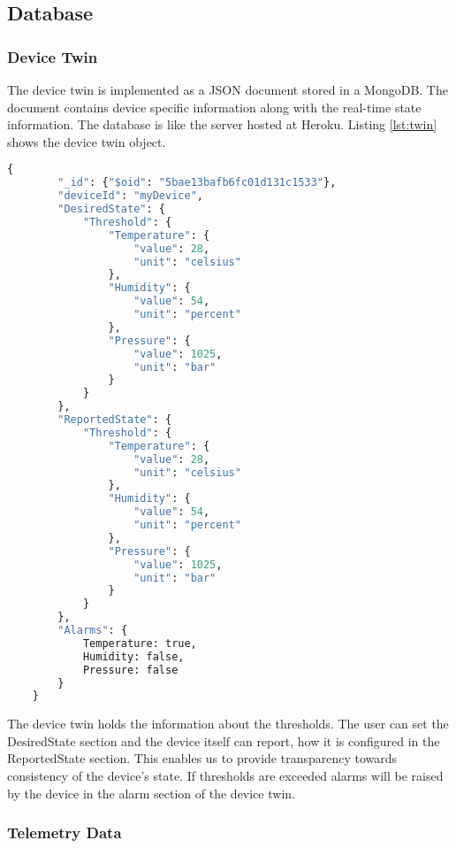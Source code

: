 \subsection{Database}
\subsubsection{Device Twin}
The device twin is implemented as a JSON document stored in a MongoDB. The document contains device specific information along with the real-time state information. The database is like the server hosted at Heroku. Listing \ref{lst:twin} shows the device twin object.
\begin{lstlisting}[language=Python, caption=Device Twin, label={lst:twin}, basicstyle=\tiny]
    {
        "_id": {"$oid": "5bae13bafb6fc01d131c1533"}, 
        "deviceId": "myDevice", 
        "DesiredState": {
            "Threshold": {
                "Temperature": {
                    "value": 28, 
                    "unit": "celsius"
                }, 
                "Humidity": {
                    "value": 54, 
                    "unit": "percent"
                }, 
                "Pressure": {
                    "value": 1025, 
                    "unit": "bar"
                }
            }
        }, 
        "ReportedState": {
            "Threshold": {
                "Temperature": {
                    "value": 28, 
                    "unit": "celsius"
                }, 
                "Humidity": {
                    "value": 54, 
                    "unit": "percent"
                }, 
                "Pressure": {
                    "value": 1025, 
                    "unit": "bar"
                }
            }
        }, 
        "Alarms": {
            Temperature: true,
            Humidity: false,
            Pressure: false
        }
    } 
\end{lstlisting}

The device twin holds the information about the thresholds. The user can set the DesiredState section and the device itself can report, how it is configured in the ReportedState section. This enables us to provide transparency towards consistency of the device's state. If thresholds are exceeded alarms will be raised by the device in the alarm section of the device twin.

\subsubsection{Telemetry Data}

